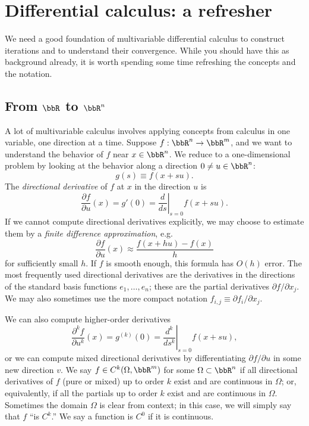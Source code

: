 \documentclass[12pt, leqno]{article} %
\begin{document}
\section*{Differential calculus: a refresher}

We need a good foundation of multivariable differential calculus
to construct iterations and to understand their convergence.
While you should have this as background already, it is worth
spending some time refreshing the concepts and the notation.

\subsection*{From $\bbR$ to $\bbR^n$}


A lot of multivariable calculus involves applying concepts from
calculus in one variable, one direction at a time.
Suppose $f : \bbR^n \rightarrow \bbR^m$, and we want to
understand the behavior of $f$ near $x \in \bbR^n$.
We reduce to a one-dimensional problem by looking
at the behavior along a direction $0 \neq u \in \bbR^n$:
\[
  g(s) \equiv f(x+su).
\]
The {\em directional derivative} of $f$ at $x$ in the direction
$u$ is 
\[
  \frac{\partial f}{\partial u}(x) =
  g'(0) = 
  \left. \frac{d}{ds} \right|_{s=0} f(x+su).
\]
If we cannot compute directional derivatives explicitly, we may choose
to estimate them by a {\em finite difference approximation}, e.g.
\[
  \frac{\partial f}{\partial u}(x) \approx \frac{f(x+hu)-f(x)}{h}
\]
for sufficiently small $h$.  If $f$ is smooth enough, this formula has
$O(h)$ error.  The most frequently used directional derivatives are
the derivatives in the directions of the standard basis functions
$e_1, \ldots, e_n$; these are the partial derivatives $\partial f /
\partial x_j$.  We may also sometimes use the more compact notation
$f_{i,j} \equiv \partial f_i / \partial x_j$.

We can also compute higher-order derivatives
\[
  \frac{\partial^k f}{\partial u^k}(x) =
  g^{(k)}(0) =
  \left. \frac{d^k}{ds^k} \right|_{s=0} f(x+su),
\]
or we can compute mixed directional derivatives by differentiating
$\partial f/\partial u$ in some new direction $v$.  We say
$f \in C^k(\Omega, \bbR^m)$ for some $\Omega \subset \bbR^n$ if all
directional derivatives of $f$ (pure or mixed) up to order $k$ exist
and are continuous in $\Omega$; or, equivalently, if all the partials
up to order $k$ exist and are continuous in $\Omega$.  Sometimes the
domain $\Omega$ is clear from context; in this case, we will simply
say that $f$ ``is $C^k$.''  We say a function is $C^0$ if it is
continuous.
\end{document}
